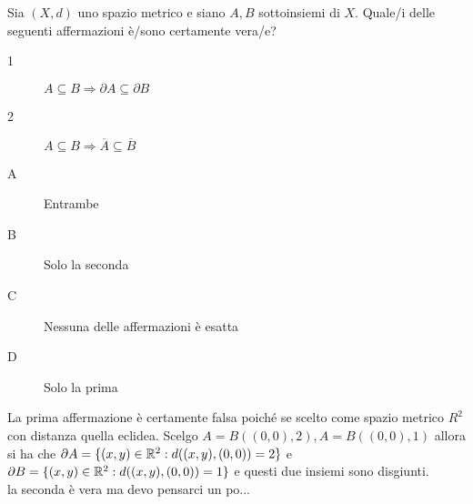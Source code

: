 \begin{exercise}
	Sia $(X,d)$ uno spazio metrico e siano $A, B$ sottoinsiemi di $X$. Quale/i delle seguenti affermazioni è/sono certamente vera/e?
	\begin{description}
		\item[1] $A\subseteq B\Rightarrow\partial A\subseteq \partial B$
		\item[2] $A\subseteq B\Rightarrow\overline{A}\subseteq\overline{B}$
	\end{description}
	\begin{description}
		\item[A] Entrambe
		\item[B] Solo la seconda
		\item[C] Nessuna delle affermazioni è esatta
		\item[D] Solo la prima
	\end{description}
	La prima affermazione è certamente falsa poiché se scelto come spazio metrico $R^2$ con distanza quella eclidea. Scelgo $A=B((0,0),2), A=B((0,0),1)$ allora si ha che $\partial A = \{(x,y)\in \mathbb{R}^2:d((x,y),(0,0))=2\}$ e $\partial B = \{(x,y)\in \mathbb{R}^2:d((x,y),(0,0))=1\}$ e questi due insiemi sono disgiunti.\\
	la seconda è vera ma devo pensarci un po...\\
\end{exercise}


